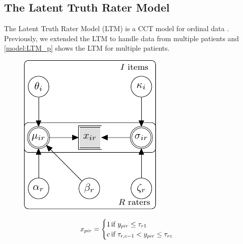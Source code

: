 \documentclass[a4paper,11pt]{article}
\begin{document}
\subsection{The Latent Truth Rater Model}
The Latent Truth Rater Model (LTM) is a CCT model for ordinal data \parencite{Anders2015cultural}.
Previously, we extended the LTM to handle data from multiple patients \parencite{vandenBergh2020cultural} and \autoref{model:LTM_p} shows the LTM for multiple patients.
\begin{figure}[!ht]
	\begin{minipage}{0.55\textwidth}
		\centering
		\includegraphics[width=\textwidth, page=7]{graphicalmodels.pdf}
	\end{minipage}\hfill
	\begin{minipage}{0.45\textwidth}
		{\normalsize
			\begin{align*}
			\oneScore &\assignment
			\begin{cases}
			1		&\hspace{-.3cm} \text{if } \oneAppraisal \leq \Threshold_{\Irater 1} \\
			\Incat	&\hspace{-.3cm} \text{if } \Threshold_{\Irater, \Incat-1} < \oneAppraisal \leq \Threshold_{\Irater\Incat} \\

\end{cases}
\end{align*}}
\end{minipage}
\end{figure}
\end{document}
